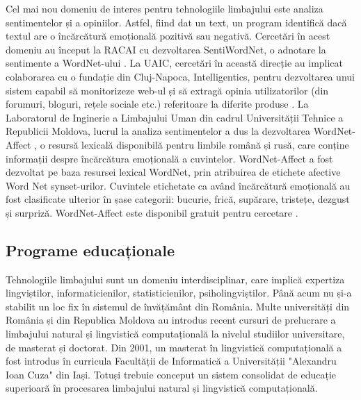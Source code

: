 \documentclass[]{../../metanetpaper}
\begin{document}
\begin{multicols}{2}
Cel mai nou domeniu de interes pentru tehnologiile limbajului este analiza sentimentelor și a opiniilor. Astfel, fiind dat un text, un program identifică dacă textul are o încărcătură emoțională pozitivă sau negativă. Cercetări în acest domeniu au început la RACAI cu dezvoltarea SentiWordNet, o adnotare la sentimente a WordNet-ului \cite{sentiwn}. La UAIC, cercetări în această direcție au implicat colaborarea cu o fundație din Cluj-Napoca, Intelligentics, pentru dezvoltarea unui sistem capabil să monitorizeze web-ul și să extragă opinia utilizatorilor (din forumuri, bloguri, rețele sociale etc.) referitoare la diferite produse \cite{sentimatrix}. La Laboratorul de Inginerie a Limbajului Uman din cadrul Universității Tehnice a Republicii Moldova, lucrul la analiza sentimentelor a dus la dezvoltarea WordNet-Affect \cite{senti_md}, o resursă lexicală disponibilă pentru limbile română și rusă, care conține informații despre încărcătura emoțională a cuvintelor. WordNet-Affect a fost dezvoltat pe baza resursei lexical WordNet, prin atribuirea de etichete afective Word Net synset-urilor. Cuvintele etichetate ca având încărcătură emoțională au fost clasificate ulterior în șase categorii: bucurie, frică, supărare, tristețe, dezgust și surpriză. WordNet-Affect este disponibil gratuit pentru cercetare \cite{wndom}.

\subsection{Programe educaționale}
Tehnologiile limbajului sunt un domeniu interdisciplinar, care implică expertiza lingviștilor, informaticienilor, statisticienilor, psiholingviștilor. Până acum nu și-a stabilit un loc fix în sistemul de învățământ din România. Multe universități din România și din Republica Moldova au introdus recent cursuri de prelucrare a limbajului natural și lingvistică computațională la nivelul studiilor universitare, de masterat și doctorat. Din 2001, un masterat în lingvistică computațională a fost introdus în curricula Facultății de Informatică a Universității "Alexandru Ioan Cuza" din Iași. Totuși trebuie conceput un sistem consolidat de educație superioară în procesarea limbajului natural și lingvistică computațională.


\end{multicols}
\end{document}

